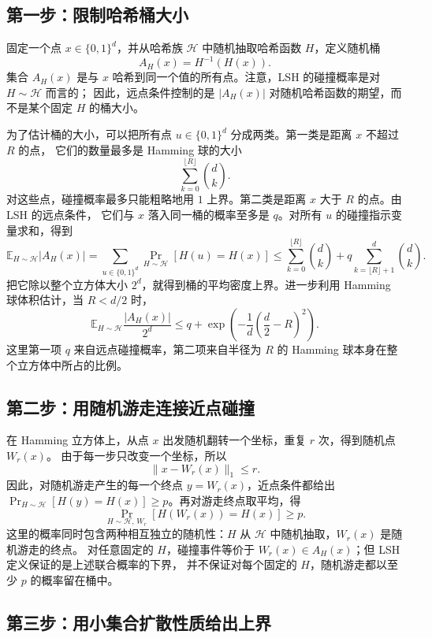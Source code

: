 \documentclass[UTF8,11pt,a4paper]{ctexart}
\newcommand{\Prb}{\operatorname{Pr}}
\newcommand{\E}{\mathbb{E}}
\begin{document}
\subsection{第一步：限制哈希桶大小}

固定一个点 $x\in\{0,1\}^d$，并从哈希族 $\mathcal{H}$ 中随机抽取哈希函数 $H$，定义随机桶
\[
  A_H(x)=H^{-1}(H(x)).
\]
集合 $A_H(x)$ 是与 $x$ 哈希到同一个值的所有点。注意，LSH 的碰撞概率是对 $H\sim\mathcal{H}$ 而言的；
因此，远点条件控制的是 $|A_H(x)|$ 对随机哈希函数的期望，而不是某个固定 $H$ 的桶大小。

为了估计桶的大小，可以把所有点 $u\in\{0,1\}^d$ 分成两类。第一类是距离 $x$ 不超过 $R$ 的点，
它们的数量最多是 Hamming 球的大小
\[
  \sum_{k=0}^{\lfloor R\rfloor}\binom{d}{k}.
\]
对这些点，碰撞概率最多只能粗略地用 $1$ 上界。第二类是距离 $x$ 大于 $R$ 的点。由 LSH 的远点条件，
它们与 $x$ 落入同一桶的概率至多是 $q$。对所有 $u$ 的碰撞指示变量求和，得到
\[
  \E_{H\sim\mathcal{H}}|A_H(x)|
  =
  \sum_{u\in\{0,1\}^d}
  \Prb_{H\sim\mathcal{H}}[H(u)=H(x)]
  \le
  \sum_{k=0}^{\lfloor R\rfloor}\binom{d}{k}
  +
  q\sum_{k=\lfloor R\rfloor+1}^{d}\binom{d}{k}.
\]
把它除以整个立方体大小 $2^d$，就得到桶的平均密度上界。进一步利用 Hamming 球体积估计，当 $R<d/2$ 时，
\[
  \E_{H\sim\mathcal{H}}\frac{|A_H(x)|}{2^d}
  \le
  q+
  \exp\left(
    -\frac{1}{d}\left(\frac d2-R\right)^2
  \right).
\]
这里第一项 $q$ 来自远点碰撞概率，第二项来自半径为 $R$ 的 Hamming 球本身在整个立方体中所占的比例。

\subsection{第二步：用随机游走连接近点碰撞}

在 Hamming 立方体上，从点 $x$ 出发随机翻转一个坐标，重复 $r$ 次，得到随机点 $W_r(x)$。
由于每一步只改变一个坐标，所以
\[
  \|x-W_r(x)\|_1\le r.
\]
因此，对随机游走产生的每一个终点 $y=W_r(x)$，近点条件都给出
\(\Prb_{H\sim\mathcal{H}}[H(y)=H(x)]\ge p\)。再对游走终点取平均，得
\[
  \Prb_{H\sim\mathcal{H},\,W_r}
  [H(W_r(x))=H(x)]
  \ge p.
\]
这里的概率同时包含两种相互独立的随机性：$H$ 从 $\mathcal{H}$ 中随机抽取，$W_r(x)$ 是随机游走的终点。
对任意固定的 $H$，碰撞事件等价于 $W_r(x)\in A_H(x)$；但 LSH 定义保证的是上述联合概率的下界，
并不保证对每个固定的 $H$，随机游走都以至少 $p$ 的概率留在桶中。

\subsection{第三步：用小集合扩散性质给出上界}
\end{document}
